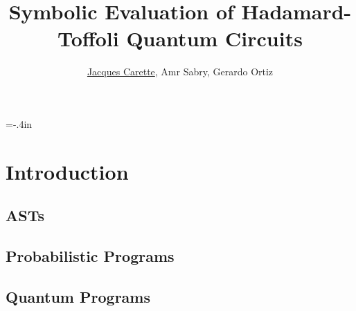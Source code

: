 \documentclass{beamer}
\title[\pgfuseimage{logo}] %
{Symbolic Evaluation of Hadamard-Toffoli Quantum Circuits}
\author[]{\underline{Jacques Carette}, Amr Sabry, Gerardo Ortiz}
\begin{document}
%

\hoffset=-.4in %
\begin{frame}[plain]

\titlepage

\end{frame}
\hoffset=0in %


\section[Introduction]{Introduction}

\subsection[ASTs]{ASTs}
\subsection[Probabilistic]{Probabilistic Programs}
\subsection[Quantum]{Quantum Programs}

\end{document}
